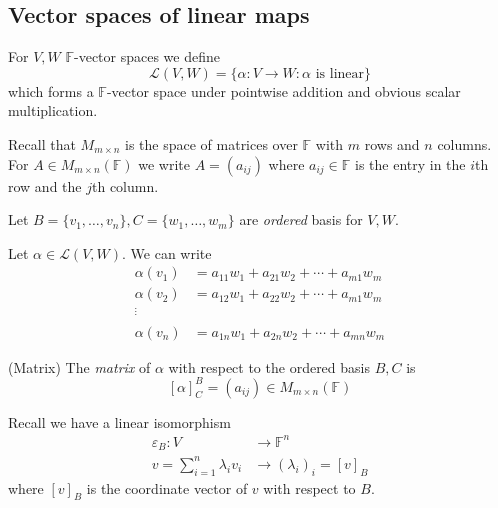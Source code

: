 \documentclass{article}
\newcommand{\F}{\mathbb{F}}
\begin{document}
\subsection{Vector spaces of linear maps}
\begin{definition}
  For $ V,W $ $ \F $-vector spaces we define
  \[
	  \mathcal L(V,W)=\{\alpha:V\to W:\alpha\text{ is linear} \}
  \]
  which forms a $ \F $-vector space under pointwise addition and obvious scalar multiplication.
\end{definition}
Recall that $ M_{m\times n} $ is the space of matrices over $ \F $ with $ m $ rows and $ n $ columns. For $ A\in M_{m\times n}(\F) $ we write $ A=(a_{ij}) $ where $ a_{ij}\in \F $ is the entry in the $ i $th row and the $ j $th column.\par
Let $ B=\{v_1,\dots, v_n\}, C=\{w_1,\dots, w_m\} $ are \textit{ordered} basis for $ V,W $.\par
Let $ \alpha\in\mathcal L(V,W) $. We can write
\begin{align*}
	\alpha(v_1)&=a_{11}w_1+a_{21}w_2+\cdots + a_{m1}w_m\\
	\alpha(v_2)&=a_{12}w_1+a_{22}w_2+\cdots + a_{m1}w_m\\
	^\vdots\\
	\alpha(v_n)&=a_{1n}w_1+a_{2n}w_2+\cdots +a_{mn}w_m
\end{align*}
\begin{definition}
	(Matrix) The \textit{matrix} of $ \alpha $ with respect to the ordered basis $ B,C $ is
	\[
		[\alpha]^B_C=(a_{ij})\in M_{m\times n}(\F)
	\]
\end{definition}
Recall we have a linear isomorphism
\begin{align*}
	\varepsilon_B:V &\to \F^n\\
	v=\sum_{i=1}^n\lambda_iv_i &\to (\lambda_i)_i=[v]_B
\end{align*}
where $ [v]_B $ is the coordinate vector of $ v $ with respect to $ B $.
\end{document}
